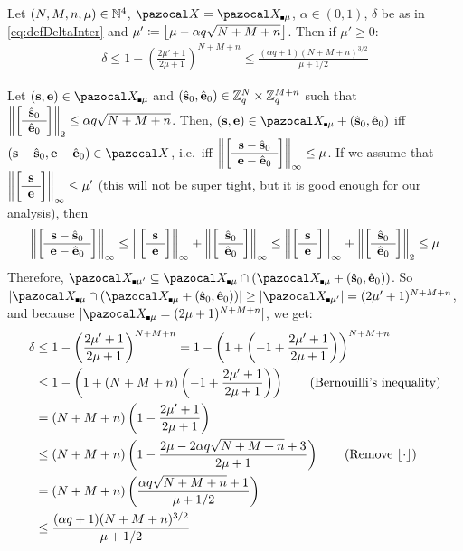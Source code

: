 {  \begin{lemmaE}[]\label{lem:upperBoundDelta}
    Let $(N,M,n,\mu) \in \N^4$, $\cX = \ccXCube[\mu]$, $\alpha \in (0,1)$, $\delta$ be as in \cref{eq:defDeltaInter} and $\mu' \eqdef \floor*{\mu  - \alpha q \sqrt{N+M+n}}$. Then if $\mu' \geq 0$:
    \begin{align}
      \delta \leq 1-\left(\frac{2\mu'+1}{2\mu+1}\right)^{N+M+n} \leq \frac{(\alpha q + 1)(N+M+n)^{3/2}}{\mu+1/2}
    \end{align}
  \end{lemmaE}
  \begin{proofE}
    Let $ (\vect{s},\vect{e}) \in \ccXCube[\mu]$ and $(\hat{\vect{s}}_0,\hat{\vect{e}}_0) \in \Z_q^N \times \Z_q^{M+n}$ such that $\left\|\SmallBlockMatrix{\hat{\vect{s}}_0}{\hat{\vect{e}}_0}\right\|_2 \leq \alpha q \sqrt{N+M+n}$. Then, $(\vect{s},\vect{e})\in \ccXCube[\mu] + (\hat{\vect{s}}_0,\hat{\vect{e}}_0)$ iff $(\vect{s}-\hat{\vect{s}}_0,\vect{e}-\hat{\vect{e}}_0)\in \cX$, i.e.\ iff $\left\|\SmallBlockMatrix{\vect{s}-\hat{\vect{s}}_0}{\vect{e}-\hat{\vect{e}}_0}\right\|_\infty \leq \mu$.
    If we assume that $\left\|\SmallBlockMatrix{\vect{s}}{\vect{e}}\right\|_\infty \leq \mu'$ (this will not be super tight, but it is good enough for our analysis), then
    \begin{align}
      \left\|\SmallBlockMatrix{\vect{s}-\hat{\vect{s}}_0}{\vect{e}-\hat{\vect{e}}_0}\right\|_\infty
      \leq \left\|\SmallBlockMatrix{\vect{s}}{\vect{e}}\right\|_\infty + \left\|\SmallBlockMatrix{\hat{\vect{s}}_0}{\hat{\vect{e}}_0}\right\|_\infty
      \leq \left\|\SmallBlockMatrix{\vect{s}}{\vect{e}}\right\|_\infty + \left\|\SmallBlockMatrix{\hat{\vect{s}}_0}{\hat{\vect{e}}_0}\right\|_2 \leq \mu
    \end{align}
    Therefore, $\ccXCube[\mu'] \subseteq \ccXCube[\mu] \cap (\ccXCube[\mu] + (\hat{\vect{s}}_0,\hat{\vect{e}}_0))$. So $|\ccXCube[\mu] \cap (\ccXCube[\mu] + (\hat{\vect{s}}_0,\hat{\vect{e}}_0))| \geq |\ccXCube[\mu']| = (2\mu'+1)^{N+M+n}$, and because $|\ccXCube[\mu] = (2\mu+1)^{N+M+n}|$, we get:
    \begingroup
    \allowdisplaybreaks
    \begin{align}
      \delta
      &\leq 1-\left(\frac{2\mu'+1}{2\mu+1}\right)^{N+M+n} = 1-\left(1+\left(-1+\frac{2\mu'+1}{2\mu+1}\right)\right)^{N+M+n}\nonumber\\
      &\leq 1-\left(1+(N+M+n)\left(-1+\frac{2\mu'+1}{2\mu+1}\right)\right)\tag{Bernouilli's inequality}\\
      &= (N+M+n)\left(1-\frac{2\mu'+1}{2\mu+1}\right)\nonumber\\
      & \leq (N+M+n)\left(1-\frac{2\mu-2\alpha q \sqrt{N+M+n}+3}{2\mu+1}\right) \tag{Remove $\floor{\cdot}$}\\
      & = (N+M+n)\left(\frac{\alpha q \sqrt{N+M+n}+1}{\mu+1/2}\right)\nonumber\\
      & \leq \frac{(\alpha q + 1)(N+M+n)^{3/2}}{\mu+1/2}
    \end{align}
    \endgroup
  \end{proofE}

}
